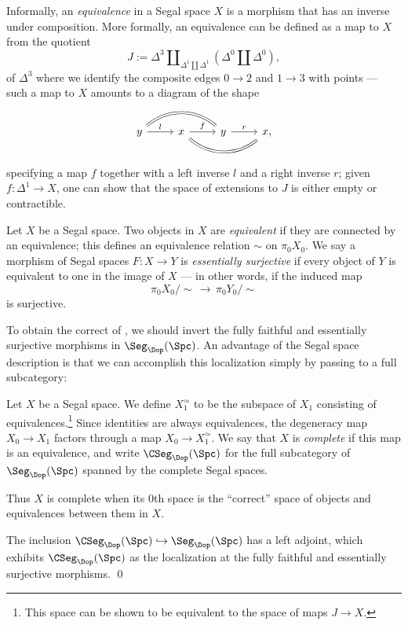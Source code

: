 \documentclass[a4paper,12pt]{article}
\begin{document}
\begin{defn}
  Informally, an \emph{equivalence} in a Segal space $X$ is a morphism
  that has an inverse under composition. More formally, an equivalence can
  be defined as a map to $X$ from the quotient
  \[ J := \Delta^{3} \amalg_{\Delta^{1} \amalg \Delta^{1}}
    (\Delta^{0} \amalg \Delta^{0}),\]
  of $\Delta^{3}$ where
  we identify the composite edges $0 \to 2$ and $1 \to 3$ with points
  --- such a map to $X$ amounts to a diagram of the shape
  \[
    \begin{tikzcd}
      y \ar[rr, bend left=40, equals] \ar[r, "l"] & x \ar[r, "f"]
      \ar[rr, bend right=40, equals] & y \ar[r, "r"] & x,
    \end{tikzcd}
  \]
  specifying a map $f$ together with a left inverse $l$ and a right
  inverse $r$; given $f \colon \Delta^{1} \to X$, one can show that
  the space of extensions to $J$ is either empty or contractible.
\end{defn}

\begin{defn}\label{def:es}
  Let $X$ be a Segal space. Two objects in $X$ are \emph{equivalent}
  if they are connected by an equivalence; this defines an equivalence
  relation $\sim$ on $\pi_{0}X_{0}$. We say a morphism of Segal spaces
  $F \colon X \to Y$ is \emph{essentially surjective} if every object
  of $Y$ is equivalent to one in the image of $X$ --- in other words,
  if the induced map
\[ \pi_{0}X_{0}/\sim \,\to\, \pi_{0}Y_{0}/\sim \]
is surjective.
\end{defn}

To obtain the correct \icat{} of \icats{}, we should invert the fully
faithful and essentially surjective morphisms in
$\Seg_{\Dop}(\Spc)$. An advantage of the Segal space description is
that we can accomplish this localization simply by passing to a full
subcategory:
\begin{defn}\label{def:css}
  Let $X$ be a Segal space. We define $X_{1}^{\simeq}$ to be the
  subspace of $X_{1}$ consisting of equivalences.\footnote{This space
    can be shown to be equivalent to the space of maps
    $J \to X$.}  Since identities are always equivalences, the
  degeneracy map $X_{0} \to X_{1}$ factors through a map
  $X_{0} \to X_{1}^{\simeq}$. We say that $X$ is \emph{complete} if
  this map is an equivalence, and write $\CSeg_{\Dop}(\Spc)$ for the
  full subcategory of $\Seg_{\Dop}(\Spc)$ spanned by the complete
  Segal spaces.
\end{defn}
Thus $X$ is complete when its $0$th space is the ``correct'' space of
objects and equivalences between them in $X$.
\begin{thm}
  The inclusion $\CSeg_{\Dop}(\Spc) \hookrightarrow \Seg_{\Dop}(\Spc)$
  has a left adjoint, which exhibits $\CSeg_{\Dop}(\Spc)$ as the
  localization at the fully faithful and essentially surjective
  morphisms. \qed
\end{thm}
\end{document}
